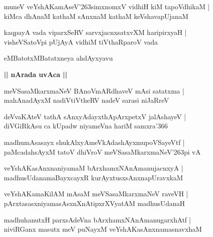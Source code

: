 \documentclass[twoside,12pt,openright]{book}
\def\S{\char'263}
\newcounter{shloka}[chapter]
\def\uvaca#1{\centerline{{\large\textbf{#1}}}}
\begin{document}
\begin{shloka}%
muneV veYshAKamAseV\S simxnomxV vidhiH kiM tapoVdhikaM |\\
kiMca dhAnaM kathaM sAnxnaM kathaM keVshavapUjanaM 
\end{shloka}

\begin{shloka}%
kaqpayA vada viparxSeRV sarvxjacnxsatxvXM haripirxyaH |\\
visheVSatoVpi pUjAyA vidhiM tiVthaRparoV vada 
\end{shloka}

\begin{center}
eMBatotxMBatatxneya ahdAyxyavu
\end{center}

\uvaca{|| nArada uvAca ||}

\begin{shloka}%
meVSasaMkarxmaNeV BAnoVmARdhaveV mAsi satatxma |\\
mahAnadAyxM nadiVtiVtheRV nadeV sarasi niJaRreV 
\end{shloka}

\begin{shloka}%
deVvaKAteV tathA sAnxyAdayxthApArxpetxV jalAshayeV |\\
diVGiRkAsu ca kUpadw niyameVna hariM samxra\char'366 
\end{shloka}

\begin{shloka}%
madhumAsasayx shukAlxyAmeVkAdashAyxmupoVSayeVtf |\\
paMcadahsAyxM tatoV dhiVroV meVSasaMkarxmaNeV\S pi vA 
\end{shloka}

\begin{shloka}%
veYshAKasAnxnaniyamaM bArxhamxNAnAmanujacnxyA |\\
madhusUdanamaBayxcayxR kurAyxtusxsAnxnapUravxkaM 
\end{shloka}

\begin{shloka}%
veYshAKamaKilAM mAsaM meVSasaMkarxmaNeV raveVH |\\
pArxtasasxniyamasAsxnXnAtipxrXVyatAM madhusUdanaH 
\end{shloka}

\begin{shloka}%
madhuhanutxH parxsAdeVna bArxhamxNAnAmanugarxhAtf |\\
niviRGanx masutx meV puNayxM veYshAKasAnxnamasnavxhaM 
\end{shloka}
\end{document}
